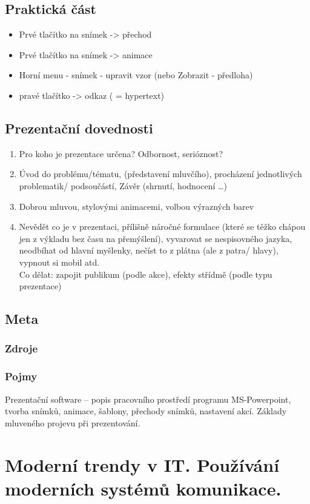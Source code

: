\documentclass[12pt]{article}
\begin{document}
\subsection{Praktická část}
\begin{itemize}
\item Prvé tlačítko na snímek -> přechod
\item Prvé tlačítko na snímek -> animace
\item Horní menu - snímek - upravit vzor (nebo Zobrazit - předloha)
\item pravé tlačítko -> odkaz ( = hypertext)
\end{itemize}
\subsection{Prezentační dovednosti}
\begin{enumerate}
\item Pro koho je prezentace určena? Odbornost, serióznost? 
\item Úvod do problému/tématu, (představení mluvčího), procházení jednotlivých problematik/ podsoučástí, Závěr (shrnutí, hodnocení \dots )
\item Dobrou mluvou, stylovými animacemi, volbou výrazných barev
\item Nevědět co je v prezentaci, přílišně náročné formulace (které se těžko chápou jen z výkladu bez času na přemýšlení), vyvarovat se nespisovného jazyka, neodbíhat od hlavní myšlenky, nečíst to z plátna (ale z patra/ hlavy), vypnout si mobil atd.\\
Co dělat: zapojit publikum (podle akce), efekty střídmě (podle typu prezentace)
\end{enumerate}
\subsection{Meta}
\subsubsection{Zdroje}
\subsubsection{Pojmy}
Prezentační software – popis pracovního prostředí programu MS-Powerpoint, tvorba snímků, animace, šablony, přechody snímků, nastavení akcí. Základy mluveného projevu při prezentování.

\section{Moderní trendy v IT. Používání moderních systémů komunikace.}
\end{document}
